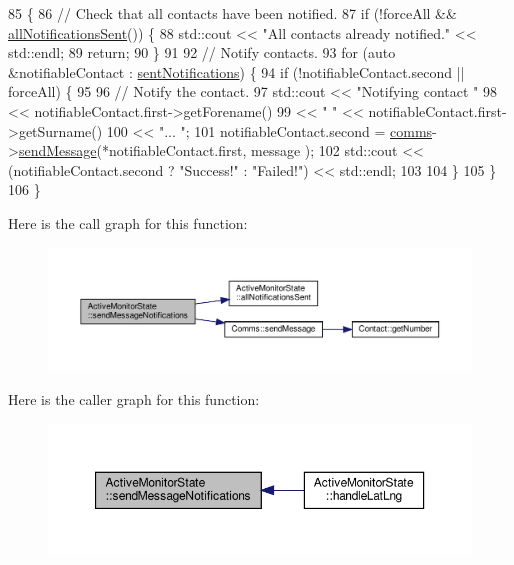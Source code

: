 \begin{DoxyCode}
85 \{
86     \textcolor{comment}{// Check that all contacts have been notified.}
87     \textcolor{keywordflow}{if} (!forceAll && \hyperlink{class_active_monitor_state_add557ab0dd0774482c08c982b82395e7}{allNotificationsSent}()) \{
88         std::cout << \textcolor{stringliteral}{"All contacts already notified."} << std::endl;
89         \textcolor{keywordflow}{return};
90     \}
91 
92     \textcolor{comment}{// Notify contacts.}
93     \textcolor{keywordflow}{for} (\textcolor{keyword}{auto} &notifiableContact : \hyperlink{class_active_monitor_state_a25493a87079926faf7d03b8587ad9f62}{sentNotifications}) \{
94         \textcolor{keywordflow}{if} (!notifiableContact.second || forceAll) \{
95 
96             \textcolor{comment}{// Notify the contact.}
97             std::cout << \textcolor{stringliteral}{"Notifying contact "}
98                       << notifiableContact.first->getForename()
99                       << \textcolor{stringliteral}{" "} << notifiableContact.first->getSurname()
100                       << \textcolor{stringliteral}{"... "};
101             notifiableContact.second = \hyperlink{class_monitor_state_a41914e9963c67ef2d17774f04bad3518}{comms}->\hyperlink{class_comms_a30ab10ea604ab2b169ca66f3f1071c0e}{sendMessage}(*notifiableContact.first, message
      );
102             std::cout << (notifiableContact.second ? \textcolor{stringliteral}{"Success!"} : \textcolor{stringliteral}{"Failed!"}) << std::endl;
103 
104         \}
105     \}
106 \}
\end{DoxyCode}
Here is the call graph for this function\+:
\nopagebreak
\begin{figure}[H]
\begin{center}
\leavevmode
\includegraphics[width=350pt]{d9/db8/class_active_monitor_state_aae5b3a425c74e7017446be277d69c06d_cgraph}
\end{center}
\end{figure}
Here is the caller graph for this function\+:
\nopagebreak
\begin{figure}[H]
\begin{center}
\leavevmode
\includegraphics[width=350pt]{d9/db8/class_active_monitor_state_aae5b3a425c74e7017446be277d69c06d_icgraph}
\end{center}
\end{figure}
